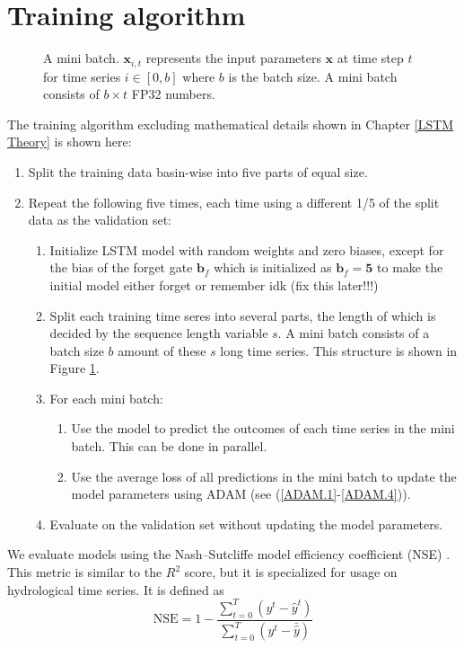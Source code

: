 \section{Training algorithm}
\begin{figure}
\centering

\caption{A mini batch. $\bm{x}_{i,t}$ represents the input parameters $\bm{x}$ at time step $t$ for time series $i \in [0, b]$ where $b$ is the batch size. A mini batch consists of $b \times t$ FP32 numbers.}
\label{mini batch}
\end{figure}
The training algorithm excluding mathematical details shown in Chapter \ref{LSTM Theory} 
is shown here:
\begin{enumerate}
    \item Split the training data basin-wise into five parts of equal size.
    \item Repeat the following five times, each time using a different 1/5 of the 
        split data as the validation set: \begin{enumerate}
            \item Initialize LSTM model with random weights and zero biases, except for the bias of the forget gate $\bm{b}_f$ which is initialized as $\bm{b}_f=\bm{5}$ to make the initial model either forget or remember idk (fix this later!!!) \citationneeded
        \item Split each training time seres into several parts, the length 
            of which is decided by the sequence length variable $s$. A mini batch 
            consists of a batch size $b$ amount of these $s$ long time series. This 
                structure is shown in Figure \ref{mini batch}.
        \item For each mini batch:
        \begin{enumerate}
            \item Use the model to predict the outcomes of each time series in the 
                mini batch. This can be done in parallel.
            \item Use the average loss of all predictions in the mini batch to update 
                the model parameters using ADAM (see (\ref{ADAM.1}-\ref{ADAM.4})).
        \end{enumerate}
        \item Evaluate on the validation set without updating the model parameters.
    \end{enumerate}
\end{enumerate}
We evaluate models using the Nash–Sutcliffe model efficiency coefficient (NSE) \citep{NSE}.
This metric is similar to the $R^2$ score, but it is specialized for usage 
on hydrological time series.
It is defined as 
\begin{equation}
    \text{NSE} = 1 - \frac{\sum_{t=0}^T\left( y^t - \hat{y}^t\right)}{\sum_{t=0}^T\left(y^t - \bar{\hat{y}}\right)} \label{NSE}
\end{equation}

